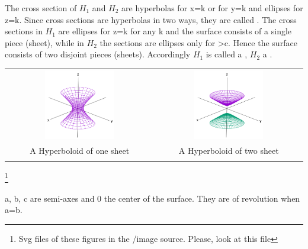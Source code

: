 \documentclass[11pt]{amsbook}
\begin{document}

\par
The cross section of $H_1$ and $H_2$ are hyperbolas for x=k or for y=k and ellipses for z=k. Since cross sections are hyperbolas in two ways, they are called . The cross sections in $H_1$ are ellipses for z=k for any k and the surface consists of a single piece (sheet), while in $H_2$ the sections are ellipses only for \textgreater \text{ }c. Hence the surface consists of two disjoint pieces (sheets). Accordingly $H_1$ is called a , $H_2$ a .\\


\begin{tabular}{cc}
	\includegraphics[width=0.49\textwidth]{images/onesheet}
	&
	\includegraphics[width=0.49\textwidth]{images/twosheet}\\

	A Hyperboloid of one sheet 
	&
	A Hyperboloid of two sheet\\\\
\end{tabular}
\footnote{Svg files of these figures in the /image source. Please, look at this file}

\par
a, b, c are semi-axes and 0 the center of the surface. They are of revolution when a=b.
\end{document}
